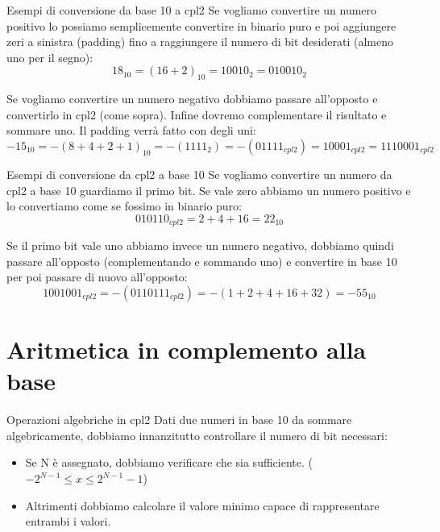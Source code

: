 \documentclass[aspectratio=169]{beamer}
\begin{document}
\begin{frame}{Esempi di conversione da base 10 a cpl2}
Se vogliamo convertire un numero positivo lo possiamo semplicemente convertire in binario puro e poi aggiungere zeri a sinistra (padding) fino a raggiungere il numero di bit desiderati (almeno uno per il segno):
\[ 18_{10} = (16+2)_{10} = 10010_2 = 010010_2 \]

\pause
Se vogliamo convertire un numero negativo dobbiamo passare all'opposto e convertirlo in cpl2 (come sopra).
Infine dovremo complementare il risultato e sommare uno.
Il padding verrà fatto con degli uni:
\[ -15_{10} = -(8+4+2+1)_{10} = -(1111_2) = -(01111_{cpl2}) = 10001_{cpl2} = 1110001_{cpl2} \]
\end{frame}

\begin{frame}{Esempi di conversione da cpl2 a base 10}
Se vogliamo convertire un numero da cpl2 a base 10 guardiamo il primo bit.
Se vale zero abbiamo un numero positivo e lo convertiamo come se fossimo in binario puro:
\[ 010110_{cpl2} = 2+4+16 = 22_{10} \]

\pause
Se il primo bit vale uno abbiamo invece un numero negativo, dobbiamo quindi passare all'opposto (complementando e sommando uno) e convertire in base 10 per poi passare di nuovo all'opposto:
\[1001001_{cpl2} = -(0110111_{cpl2}) = -(1+2+4+16+32) = -55_{10}\]
\end{frame}

\section{Aritmetica in complemento alla base}

\begin{frame}{Operazioni algebriche in cpl2}
Dati due numeri in base 10 da sommare algebricamente, dobbiamo innanzitutto controllare il numero di bit necessari:
\begin{itemize}
\item Se N è assegnato, dobbiamo verificare che sia sufficiente. ($-2^{N-1} \leq x \leq 2^{N-1}-1$)
\item Altrimenti dobbiamo calcolare il valore minimo capace di rappresentare \alert{entrambi} i valori.
\end{itemize}
\end{frame}
\end{document}
